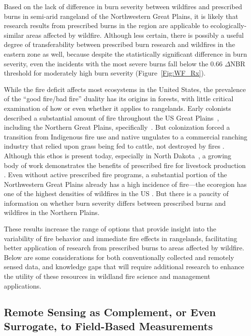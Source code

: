 \documentclass[fire,article,accept,oneauthor,pdftex]{Definitions/mdpi}
\begin{document}
Based on the lack of difference in burn severity between wildfires and prescribed burns in semi-arid rangeland of the Northwestern Great Plains, it is likely that research results from prescribed burns in the region are applicable to ecologically-similar areas affected by wildfire. 
Although less certain, there is possibly a useful degree of transferability between prescribed burn research and wildfires in the eastern zone as well, because despite the statistically significant difference in burn severity, even the incidents with the most severe burns fall below the 0.66 $\Delta$NBR threshold for moderately high burn severity \cite{key2006a} (Figure~\ref{Fig:WF_Rx}).

While the fire deficit affects most ecosystems in the United States, the prevalence of the ``good fire/bad fire'' duality has its origins in forests, with little critical examination of how or even whether it applies to rangelands. 
Early colonists described a substantial amount of fire throughout the US Great Plains~\cite{courtwright2007}, including the Northern Great Plains, specifically~\cite{higgins1984,umbanhowar1996}. 
But colonization forced a transition from Indigenous fire use and native ungulates to a commercial ranching industry that relied upon grass being fed to cattle, not destroyed by fires \cite{courtwright2007}. 
Although this ethos is present today, especially in North Dakota~\cite{boland2025}, a growing body of work demonstrates the benefits of prescribed fire for livestock production \cite{wanchuk2024, spiess2020, wanchuk2024a}. 
Even without active prescribed fire programs, a substantial portion of the Northwestern Great Plains already has a high incidence of fire---the ecoregion has one of the highest densities of wildfires in the US \cite{mcgranahan2024}. 
But there is a paucity of information on whether burn severity differs between prescribed burns and wildfires in the Northern Plains. 

These results increase the range of options that provide insight into the variability of fire behavior and immediate fire effects in rangelands, facilitating better application of research from prescribed burns to areas affected by wildfire. 
Below are some considerations for both conventionally collected and remotely sensed data, and knowledge gaps that will require additional research to enhance the utility of these resources in wildland fire science and management applications.

\subsection{Remote Sensing as Complement, or Even Surrogate, to Field-Based Measurements} 
\end{document}
